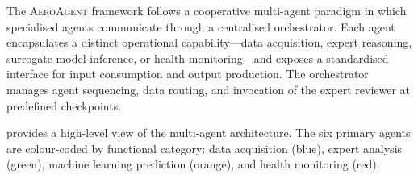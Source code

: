 \documentclass[12pt]{article}
\begin{document}
The \textsc{AeroAgent} framework follows a cooperative multi-agent paradigm \citep{Dorri2018} in which specialised agents communicate through a centralised orchestrator.
Each agent encapsulates a distinct operational capability---data acquisition, expert reasoning, surrogate model inference, or health monitoring---and exposes a standardised interface for input consumption and output production.
The orchestrator manages agent sequencing, data routing, and invocation of the expert reviewer at predefined checkpoints.

 provides a high-level view of the multi-agent architecture.
The six primary agents are colour-coded by functional category: data acquisition (blue), expert analysis (green), machine learning prediction (orange), and health monitoring (red).
\end{document}
